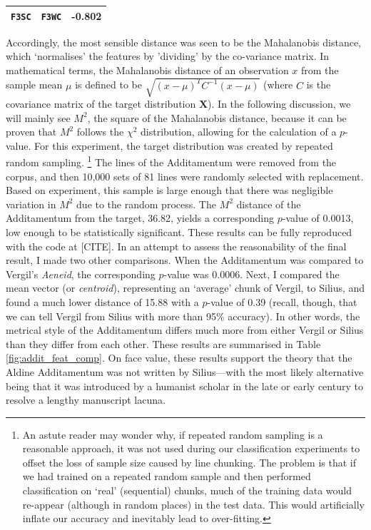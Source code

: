 \documentclass[11pt,a4paper]{scrartcl} %
\begin{document}
{\begin{table}
{\begin{tabular}{ | l | l | c |}
\texttt{F3SC} & \texttt{F3WC} & -0.802 \\
\hline
\end{tabular}}
\end{table}
Accordingly, the most sensible distance was seen to be the Mahalanobis distance, which `normalises' the features by 'dividing' by the co-variance matrix. In mathematical terms, the Mahalanobis distance of an observation $x$ from the sample mean $\mu$ is defined to be $\sqrt{(x-\mu)^{T}C^{-1}(x-\mu)}$ (where $C$ is the covariance matrix of the target distribution $\textbf{X}$). In the following discussion, we will mainly see $M^{2}$, the square of the Mahalanobis distance, because it can be proven that $M^{2}$ follows the $\chi^{2}$ distribution, allowing for the calculation of a $p$-value. For this experiment, the target distribution was created by repeated random sampling.%
\footnote{An astute reader may wonder why, if repeated random sampling is a reasonable approach, it was not used during our classification experiments to offset the loss of sample size caused by line chunking. The problem is that if we had trained on a repeated random sample and then performed classification on `real' (sequential) chunks, much of the training data would re-appear (although in random places) in the test data. This would artificially inflate our accuracy and inevitably lead to over-fitting.}
The lines of the Additamentum were removed from the corpus, and then 10,000 sets of 81 lines were randomly selected with replacement. Based on experiment, this sample is large enough that there was negligible variation in $M^{2}$ due to the random process. The $M^{2}$ distance of the Additamentum from the target, 36.82, yields a corresponding $p$-value of 0.0013, low enough to be statistically significant. These results can be fully reproduced with the code at [CITE]. In an attempt to assess the reasonability of the final result, I made two other comparisons. When the Additamentum was compared to Vergil's \textit{Aeneid}, the corresponding $p$-value was 0.0006. Next, I compared the mean vector (or \textit{centroid}), representing an `average' chunk of Vergil, to Silius, and found a much lower distance of 15.88 with a $p$-value of 0.39 (recall, though, that we can tell Vergil from Silius with more than 95\% accuracy). In other words, the metrical style of the Additamentum differs much more from either Vergil or Silius than they differ from each other. These results are summarised in Table \ref{fig:addit_feat_comp}. On face value, these results support the theory that the Aldine Additamentum was not written by Silius---with the most likely alternative being that it was introduced by a humanist scholar in the late  or early  century to resolve a lengthy manuscript lacuna. 

}
\end{document}
